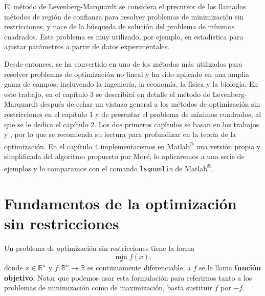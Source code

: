 \documentclass[11pt,a4paper]{book}
\theoremstyle{definition}
\theoremstyle{remark}
\def\code#1{\texttt{#1}}
\begin{document}
El método de Levenberg-Marquardt se considera el precursor de los llamados métodos de región de confianza para resolver problemas de minimización sin restricciones, y nace de la búsqueda de solución del problema de mínimos cuadrados. Este problema es muy utilizado, por ejemplo, en estadística para ajustar parámetros a partir de datos experimentales.

Desde entonces, se ha convertido en uno de los métodos más utilizados para resolver problemas de optimización no lineal y ha sido aplicado en una amplia gama de campos, incluyendo la ingeniería, la economía, la física y la biología. En este trabajo, en el capítulo 3 se describirá en detalle el método de Levenberg-Marquardt después de echar un vistazo general a los métodos de optimización sin restricciones en el capítulo 1 y de presentar el problema de mínimos cuadrados, al que se le dedica el capítulo 2. Los dos primeros capítulos se basan en los trabajos \cite{Nocedal2006-kh} y \cite{Sun2006-au}, por lo que se recomienda su lectura para profundizar en la teoría de la optimización.
En el capítulo 4 implementaremos en Matlab\textsuperscript{®} una versión propia y simplificada del algoritmo propuesto por Moré, lo aplicaremos a una serie de ejemplos y lo comparamos con el comando \code{lsqnonlin} de Matlab\textsuperscript{®}.



\mainmatter




\chapter{Fundamentos de la optimización sin restricciones}

Un problema de optimización sin restricciones tiene la forma 
\begin{equation}
	\min_{x}f\left(x\right),
	\label{eq:minf}
\end{equation}
donde $x\in\mathbb{R}^{n}$ y $f : \mathbb{R}^{n} \rightarrow \mathbb{R}$ es continuamente
diferenciable, a $f$ se le llama \textbf{función objetivo}. 
Notar que podemos usar esta formulación para referirnos tanto a los problemas de minimización
como de maximización, basta sustituir $f$ por $-f$. 
\end{document}

